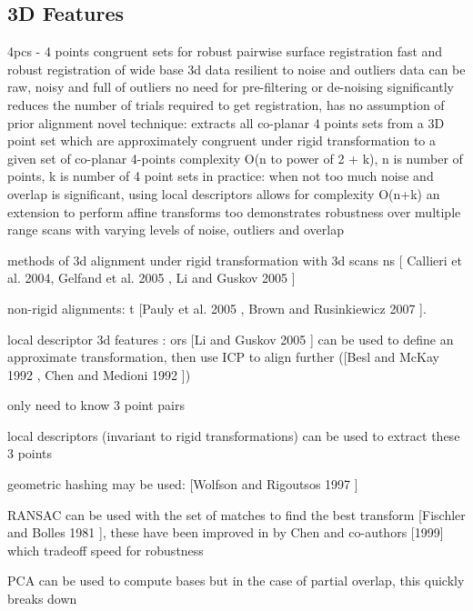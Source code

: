 \subsection{3D Features}

\cite{Aiger084}

4pcs - 4 points congruent sets for robust pairwise surface registration
fast and robust registration of wide base 3d data
resilient to noise and outliers
data can be raw, noisy and full of outliers
no need for pre-filtering or de-noising
significantly reduces the number of trials required to get registration, has no assumption of prior alignment
novel technique:
extracts all co-planar 4 points sets from a 3D point set which are approximately congruent under rigid transformation to a given set of co-planar 4-points
complexity O(n to power of 2 + k), n is number of points, k is number of 4 point sets
in practice: when not too much noise and overlap is significant,
using local descriptors allows for complexity O(n+k)
an extension to perform affine transforms too
demonstrates robustness over multiple range scans with varying levels of noise, outliers and overlap


methods of 3d alignment under rigid transformation with 3d scans
ns [\cite{Callieri04Roboscan} Callieri et al. 2004, Gelfand et al. 2005 \cite{Gelfand04Shape}, Li and Guskov
2005 \cite{Li05Multiscale}]

non-rigid alignments:
t [Pauly et al. 2005 \cite{Pauly05Example}, Brown and
Rusinkiewicz 2007 \cite{Brown07Global}].


local descriptor 3d features : ors [Li and Guskov 2005 \cite{Li05Multiscale}] can be used to define an approximate transformation, then use ICP to align further ([Besl and McKay 1992 \cite{Besl92Method}, Chen and Medioni 1992 \cite{Chen92Object}])

only need to know 3 point pairs

local descriptors (invariant to rigid transformations) can be used to extract these 3 points

geometric hashing may be used: [Wolfson and Rigoutsos 1997 \cite{Wolfson97Geometric}]

RANSAC can be used with the set of matches to find the best transform [Fischler and Bolles 1981 \cite{Fischler81Random}], 
these have been improved in by Chen and co-authors [1999] \cite{Chen99Ransac} which tradeoff speed for robustness

PCA can be used to compute bases but in the case of partial overlap, this quickly breaks down

